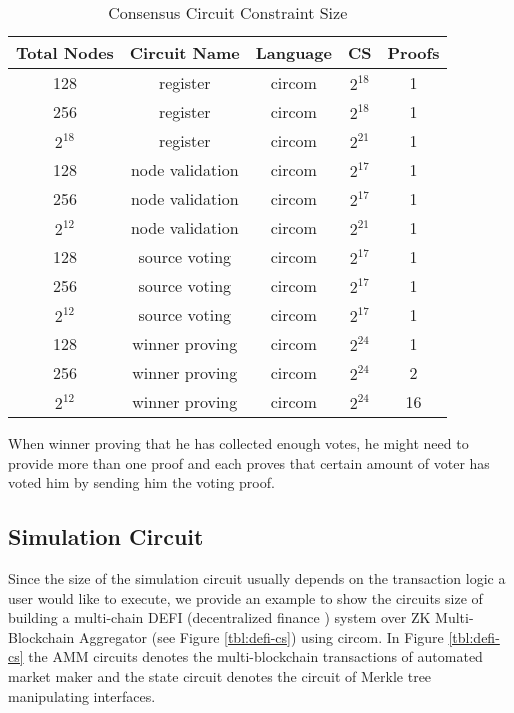 \begin{table}[!ht]
\small
\centering
\caption{Consensus Circuit Constraint Size}
\label{tbl:consensus-cs}
\begin{tabular}{ | c | c | c | c | c | }
\hline
Total Nodes & Circuit Name & Language & CS & Proofs \\
\hline
128 & register & circom & $2^{18}$ & 1\\
\hline
256 & register & circom & $2^{18}$ & 1\\
\hline
$2^{18}$ & register & circom & $2^{21}$ & 1\\
\hline
128 & node validation & circom & $2^{17}$ & 1\\
\hline
256 & node validation & circom & $2^{17}$ & 1\\
\hline
$2^{12}$ & node validation & circom & $2^{21}$ & 1 \\
\hline
128 & source voting & circom & $2^{17}$ & 1\\
\hline
256 & source voting & circom & $2^{17}$ & 1\\
\hline
$2^{12}$ & source voting & circom & $2^{17}$ & 1\\
\hline
128 & winner proving & circom & $2^{24}$ & 1\\
\hline
256 & winner proving & circom & $2^{24}$ & 2 \\
\hline
$2^{12}$ & winner proving & circom & $2^{24}$ & 16 \\
\hline
\end{tabular}
\end{table}
\begin{remark}
When winner proving that he has collected enough votes, he might need to provide more than one proof and each proves that certain amount of voter has voted him by sending him the voting proof.
\end{remark}

\subsection{Simulation Circuit}
Since the size of the simulation circuit usually depends on the transaction logic a user would like to execute, we provide an example to show the circuits size of building a multi-chain DEFI (decentralized finance \cite{zetzsche2020decentralized, chen2020blockchain}) system over ZK Multi-Blockchain Aggregator (see Figure \ref{tbl:defi-cs}) using circom. In Figure \ref{tbl:defi-cs} the AMM circuits denotes the multi-blockchain transactions of automated market maker \cite{mohan2022automated} and the state circuit denotes the circuit of Merkle tree manipulating interfaces. 

